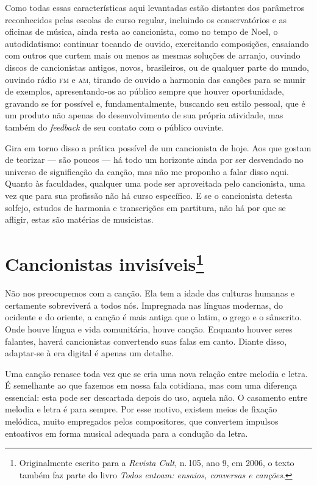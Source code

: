 Como todas essas características aqui levantadas estão distantes dos
parâmetros reconhecidos pelas escolas de curso regular, incluindo os
conservatórios e as oficinas de música, ainda resta ao cancionista,
como no tempo de Noel, o autodidatismo: continuar tocando de ouvido,
exercitando composições, ensaiando com outros que curtem mais ou menos
as mesmas soluções de arranjo, ouvindo discos de cancionistas antigos,
novos, brasileiros, ou de qualquer parte do mundo, ouvindo rádio \textsc{fm} e
\textsc{am}, tirando de ouvido a harmonia das canções para se munir de exemplos,
apresentando-os ao público sempre que houver oportunidade, gravando se for
possível e, fundamentalmente, buscando seu estilo pessoal, que é um
produto não apenas do desenvolvimento de sua própria atividade, mas
também do \textit{feedback} de seu contato com o público ouvinte.

Gira em torno disso a prática possível de um cancionista de hoje. Aos
que gostam de teorizar --- são poucos --- há todo um horizonte ainda por ser
desvendado no universo de significação da canção, mas não me proponho a
falar disso aqui. Quanto às faculdades, qualquer uma pode ser
aproveitada pelo cancionista, uma vez que para sua profissão não há
curso específico. E se o cancionista detesta solfejo, estudos de
harmonia e transcrições em partitura, não há por que se afligir, estas
são matérias de musicistas.



\chapter{Cancionistas invisíveis\footnote{Originalmente escrito para a \textit{Revista Cult}, n.\,105, ano 9, em 2006, o texto também faz parte do livro \textit{Todos entoam: ensaios, conversas e canções}.}}


Não nos preocupemos com a canção. Ela tem a idade das culturas humanas e
certamente sobreviverá a todos nós. Impregnada nas línguas modernas, do
ocidente e do oriente, a canção é mais antiga que o latim, o grego e o
sânscrito. Onde houve língua e vida comunitária, houve canção. Enquanto
houver seres falantes, haverá cancionistas convertendo suas falas em
canto. Diante disso, adaptar-se à era digital é apenas um detalhe.

Uma canção renasce toda vez que se cria uma nova relação entre melodia e
letra. É semelhante ao que fazemos em nossa fala cotidiana, mas com uma
diferença essencial: esta pode ser descartada depois do uso, aquela não.
O casamento entre melodia e letra é para sempre. Por esse motivo,
existem meios de fixação melódica, muito empregados pelos compositores,
que convertem impulsos entoativos em forma musical adequada para a
condução da letra.

